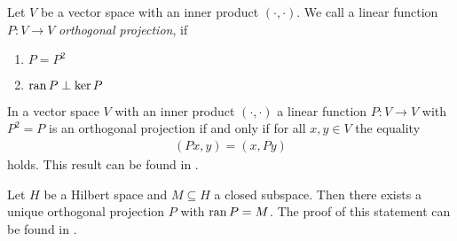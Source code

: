 \begin{definition}
	Let $V$ be a vector space with an inner product $(\cdot, \cdot)$. We call a linear function $P: V \to V$ \textit{orthogonal projection}, if
	\begin{enumerate}
		\item $P = P^2$
		\item $\operatorname{ran} P \perp \ker P$
	\end{enumerate}
\end{definition}


\begin{remark}
	In a vector space $V$ with an inner product $(\cdot, \cdot)$ a linear function $P: V \to V$ with $P^2 = P$ is an orthogonal projection if and only if for all $x,y \in V$ the equality
	\begin{align*}
		(Px, y) = (x,Py)
	\end{align*}
	holds. This result can be found in \cite[p. 47]{FAna1}.
\end{remark}


\begin{remark} \label{remark:orth_proj_uniqueness}
	Let $H$ be a Hilbert space and $M \subseteq H$ a closed subspace. Then there exists a unique orthogonal projection $P$ with $\operatorname{ran} P = M$. The proof of this statement can be found in \cite[p. 48]{FAna1}.
\end{remark}